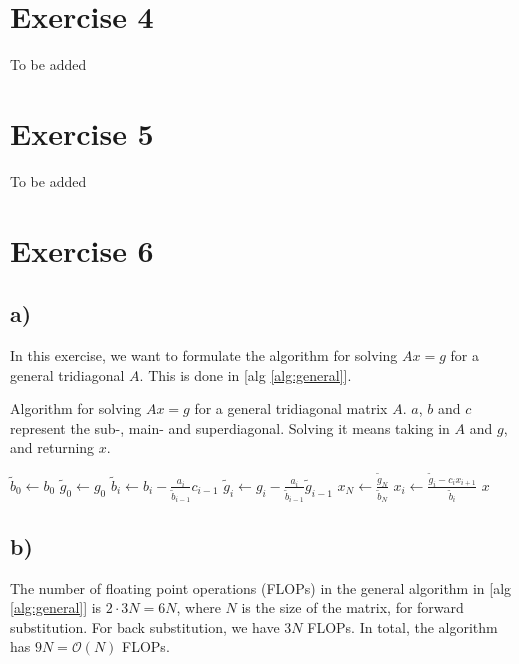 \documentclass[11pt]{article} %
\begin{document}
\section*{Exercise 4}

To be added

\section*{Exercise 5}

To be added

\section*{Exercise 6}

\subsection*{a)}

In this exercise, we want to formulate the algorithm for solving $Ax = g$ for a general tridiagonal $A$. This is done in [alg \ref{alg:general}].

\begin{algorithm}
\caption{Algorithm for solving $Ax = g$ for a general tridiagonal matrix $A$. $a$, $b$ and $c$ represent the sub-, main- and superdiagonal. Solving it means taking in $A$ and $g$, and returning $x$.}
\begin{algorithmic}[0]
    \State $\tilde{b}_0 \gets b_0$
    \State $\tilde{g}_0 \gets g_0$
        \State $\tilde{b}_i \gets b_i - \frac{a_i}{\tilde{b}_{i-1}} c_{i-1}$
        \State $\tilde{g}_i \gets g_i - \frac{a_i}{\tilde{b}_{i-1}} \tilde{g}_{i-1}$
    \EndFor
    \State $x_N \gets \frac{\tilde{g}_N}{\tilde{b}_N}$
        \State $x_i \gets \frac{\tilde{g}_i - c_i x_{i+1}}{\tilde{b}_i}$
    \EndFor
    \State \Return $x$
\EndProcedure
\end{algorithmic}
\label{alg:general}
\end{algorithm}

\subsection*{b)}
The number of floating point operations (FLOPs) in the general algorithm in [alg \ref{alg:general}] is $2 \cdot 3 N = 6N$, where $N$ is the size of the matrix, for forward substitution. For back substitution, we have $3 N$ FLOPs. In total, the algorithm has $9N = \mathcal{O}(N)$ FLOPs. 
\end{document}
